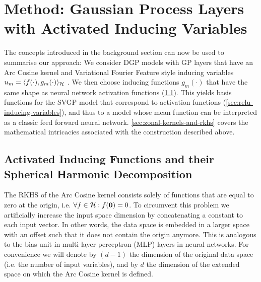 \section{Method: Gaussian Process Layers with Activated Inducing Variables}
\label{sec:model}

The concepts introduced in the background section can now be used to summarise our approach: We consider DGP models with GP layers that have an Arc Cosine kernel and Variational Fourier Feature style inducing variables $u_m = \langle f(\cdot), {g}_m(\cdot) \rangle_{{\mathcal{H}}}$ \citep{hensman2017variational}. We then choose inducing functions $g_m(\cdot)$ that have the same shape as neural network activation functions (\cref{sec:inducing-function}). This yields basis functions for the SVGP model that correspond to activation functions (\cref{sec:relu-inducing-variables}), and thus to a model whose mean function can be interpreted as a classic feed forward neural network. \cref{sec:zonal-kernels-and-rkhs} covers the mathematical intricacies associated with the construction described above.

\subsection{Activated Inducing Functions and their Spherical Harmonic Decomposition}
\label{sec:inducing-function}

The RKHS of the Arc Cosine kernel consists solely of functions that are equal to zero at the origin, i.e. $\forall f \in {\mathcal{H}}: f(\bm{0}) = 0$. 
To circumvent this problem we artificially increase the input space dimension by concatenating a constant to each input vector. In other words, the data space is embedded in a larger space with an offset such that it does not contain the origin anymore. This is analogous to the bias unit in multi-layer perceptron (MLP) layers in neural networks. For convenience we will denote by $(d-1)$ the dimension of the original data space (i.e. the number of input variables), and by $d$ the dimension of the extended space on which the Arc Cosine kernel is defined.

